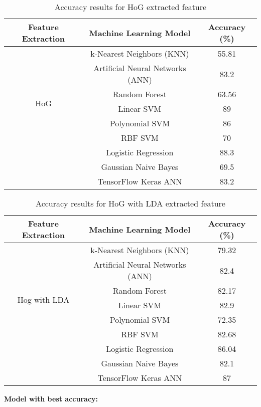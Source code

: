\documentclass[a4paper]{article}
\theoremstyle{plain}
\theoremstyle{definition}
\begin{document}
\begin{table}[htbp]
\centering
\Large
\caption{Accuracy results for HoG extracted feature}
\label{tab:results}
\begin{tabular}{|c|c|c|}
\hline
\textbf{Feature Extraction} & \textbf{Machine Learning Model} & \textbf{Accuracy (\%)} \\ \hline
\multirow{7}{*}{HoG} & k-Nearest Neighbors (KNN) & 55.81 \\ \cline{2-3} 
 & Artificial Neural Networks (ANN) & 83.2 \\ \cline{2-3} 
 & Random Forest & 63.56 \\ \cline{2-3} 
 &  Linear SVM & 89 \\ \cline{2-3} 
 & Polynomial SVM & 86 \\ \cline{2-3} 
 & RBF SVM & 70 \\ \cline{2-3} 
 & Logistic Regression & 88.3 \\ \cline{2-3} 
 & Gaussian Naive Bayes & 69.5 \\ \cline{2-3}  
 & TensorFlow Keras ANN & 83.2 \\ \hline
\end{tabular}
\end{table}







\clearpage

\begin{table}[htbp]
\centering
\Large
\caption{Accuracy results for HoG with LDA extracted feature}
\label{tab:results}
\begin{tabular}{|c|c|c|}
\hline
\textbf{Feature Extraction} & \textbf{Machine Learning Model} & \textbf{Accuracy (\%)} \\ \hline
\multirow{7}{*}{Hog with LDA } & k-Nearest Neighbors (KNN) & 79.32 \\ \cline{2-3} 
 & Artificial Neural Networks (ANN) & 82.4 \\ \cline{2-3} 
 & Random Forest & 82.17 \\ \cline{2-3} 
 &  Linear SVM & 82.9 \\ \cline{2-3} 
 & Polynomial SVM & 72.35 \\ \cline{2-3} 
 & RBF SVM & 82.68 \\ \cline{2-3} 
 & Logistic Regression & 86.04 \\ \cline{2-3} 
 & Gaussian Naive Bayes & 82.1 \\ \cline{2-3}  
 & TensorFlow Keras ANN & 87 \\ \hline
\end{tabular}
\end{table}
\textbf{Model with best accuracy:}
\end{document}
